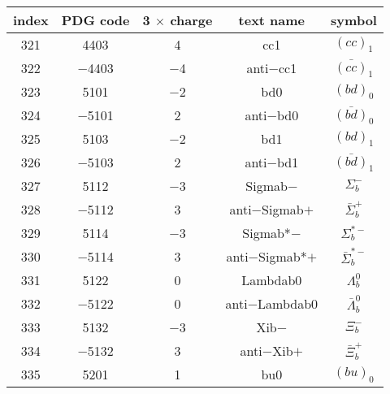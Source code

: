 \documentclass{article}
\begin{document}
\begin{table}[!htbp]
\centering
\begin{tabular}{|c|c|c|c|c|}
\hline
index & PDG code & 3 $\times$ charge & text name & symbol \\
\hline
321 & 4403 & 4 & cc\underline{\hspace{0.6em}}1 & $(cc)_{1}$ \\
\hline
322 & $-$4403 & $-$4 & anti$-$cc\underline{\hspace{0.6em}}1 & $\bar{(cc)}_{1}$ \\
\hline
323 & 5101 & $-$2 & bd\underline{\hspace{0.6em}}0 & $(bd)_{0}$ \\
\hline
324 & $-$5101 & 2 & anti$-$bd\underline{\hspace{0.6em}}0 & $\bar{(bd)}_{0}$ \\
\hline
325 & 5103 & $-$2 & bd\underline{\hspace{0.6em}}1 & $(bd)_{1}$ \\
\hline
326 & $-$5103 & 2 & anti$-$bd\underline{\hspace{0.6em}}1 & $\bar{(bd)}_{1}$ \\
\hline
327 & 5112 & $-$3 & Sigma\underline{\hspace{0.6em}}b$-$ & $\Sigma_{b}^{-}$ \\
\hline
328 & $-$5112 & 3 & anti$-$Sigma\underline{\hspace{0.6em}}b$+$ & $\bar{\Sigma}_{b}^{+}$ \\
\hline
329 & 5114 & $-$3 & Sigma\underline{\hspace{0.6em}}b*$-$ & $\Sigma_{b}^{*-}$ \\
\hline
330 & $-$5114 & 3 & anti$-$Sigma\underline{\hspace{0.6em}}b*$+$ & $\bar{\Sigma}_{b}^{*-}$ \\
\hline
331 & 5122 & 0 & Lambda\underline{\hspace{0.6em}}b0 & $\Lambda_{b}^{0}$ \\
\hline
332 & $-$5122 & 0 & anti$-$Lambda\underline{\hspace{0.6em}}b0 & $\bar{\Lambda}_{b}^{0}$ \\
\hline
333 & 5132 & $-$3 & Xi\underline{\hspace{0.6em}}b$-$ & $\Xi_{b}^{-}$ \\
\hline
334 & $-$5132 & 3 & anti$-$Xi\underline{\hspace{0.6em}}b$+$ & $\bar{\Xi}_{b}^{+}$ \\
\hline
335 & 5201 & 1 & bu\underline{\hspace{0.6em}}0 & $(bu)_{0}$ \\

\end{tabular}
\end{table}
\end{document}
